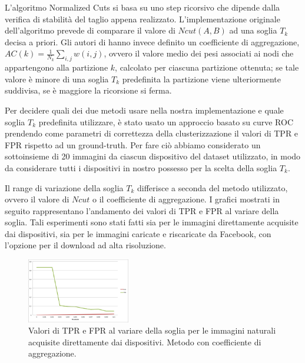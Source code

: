 L'algoritmo Normalized Cuts si basa su uno step ricorsivo che dipende dalla verifica di stabilità del taglio appena realizzato. L'implementazione originale dell'algoritmo prevede di comparare il valore di $Ncut(A,B)$ ad una soglia $T_{k}$ decisa a priori. Gli autori di \cite{ Amerini2014831} hanno invece definito un coefficiente di aggregazione, $AC(k) = \frac{1}{N_{k}} \sum_{i,j} w(i,j)$, ovvero il valore medio dei pesi associati ai nodi che appartengono alla partizione $k$, calcolato per ciascuna partizione ottenuta; se tale valore è minore di una soglia $T_{k}$ predefinita la partizione viene ulteriormente suddivisa, se è maggiore la ricorsione si ferma.

Per decidere quali dei due metodi usare nella nostra implementazione e quale soglia $T_{k}$ predefinita utilizzare, è stato usato un approccio basato su curve ROC prendendo come parametri di correttezza della clusterizzazione il valori di TPR e FPR rispetto ad un ground-truth. Per fare ciò abbiamo considerato un sottoinsieme di 20 immagini da ciascun dispositivo del dataset utilizzato, in modo da considerare tutti i dispositivi in nostro possesso per la scelta della soglia $T_{k}$.

Il range di variazione della soglia $T_{k}$ differisce a seconda del metodo utilizzato, ovvero il valore di $Ncut$ o il coefficiente di aggregazione. I grafici mostrati in seguito rappresentano l'andamento dei valori di TPR e FPR al variare della soglia. Tali esperimenti sono stati fatti sia per le immagini direttamente acquisite dai dispositivi, sia per le immagini caricate e riscaricate da Facebook, con l'opzione per il download ad alta risoluzione.

\begin{figure}[h]
\begin{center}
\includegraphics[width=0.4\textwidth]{images/soglia_imgnat_AC.png}
\end{center}
  \caption{Valori di TPR e FPR al variare della soglia per le immagini naturali acquisite direttamente dai dispositivi. Metodo con coefficiente di aggregazione.}
\label{fig:soglia AC}
\end{figure}

